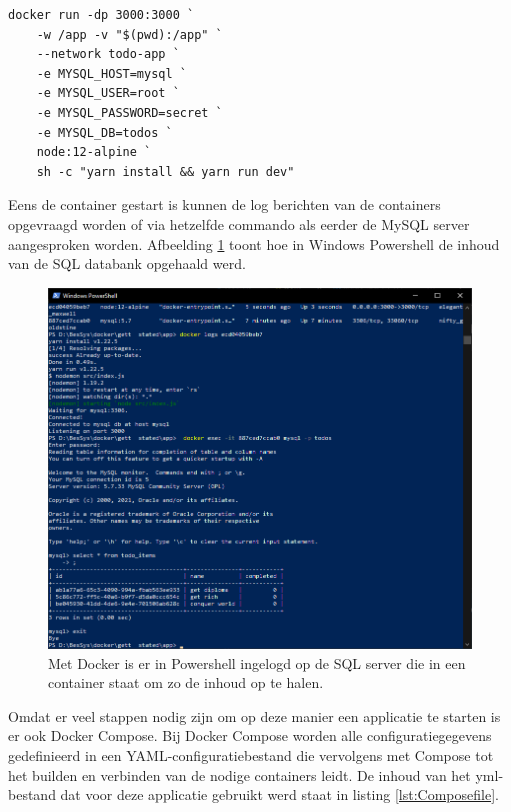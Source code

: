 \begin{lstlisting}
docker run -dp 3000:3000 `
    -w /app -v "$(pwd):/app" `
    --network todo-app `
    -e MYSQL_HOST=mysql `
    -e MYSQL_USER=root `
    -e MYSQL_PASSWORD=secret `
    -e MYSQL_DB=todos `
    node:12-alpine `
    sh -c "yarn install && yarn run dev"
\end{lstlisting}
Eens de container gestart is kunnen de log berichten van de containers opgevraagd worden of via hetzelfde commando als eerder de MySQL server aangesproken worden. Afbeelding \ref{fig:powershellsql} toont hoe in Windows Powershell de inhoud van de SQL databank opgehaald werd.
\begin{figure}[h]
    \includegraphics[width=\linewidth]{img/sqlquery.png}
    \caption[Het aanspreken van een SQL server binnen een container]{Met Docker is er in Powershell ingelogd op de SQL server die in een container staat om zo de inhoud op te halen.}
    \label{fig:powershellsql}
    \centering
\end{figure}

Omdat er veel stappen nodig zijn om op deze manier een applicatie te starten is er ook Docker Compose. Bij Docker Compose worden alle configuratiegegevens gedefinieerd in een YAML-configuratiebestand die vervolgens met Compose tot het builden en verbinden van de nodige containers leidt. De inhoud van het yml-bestand dat voor deze applicatie gebruikt werd staat in listing \ref{lst:Composefile}.

